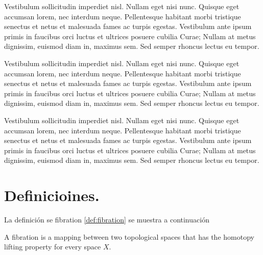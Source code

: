 	
	
	
	
	
	

	
	Vestibulum sollicitudin imperdiet nisl. Nullam eget nisi nunc. Quisque eget accumsan lorem, nec interdum neque. Pellentesque habitant morbi tristique senectus et netus et malesuada fames ac turpis egestas. Vestibulum ante ipsum primis in faucibus orci luctus et ultrices posuere cubilia Curae; Nullam at metus dignissim, euismod diam in, maximus sem. Sed semper rhoncus lectus eu tempor.
	
	Vestibulum sollicitudin imperdiet nisl. Nullam eget nisi nunc. Quisque eget accumsan lorem, nec interdum neque. Pellentesque habitant morbi tristique senectus et netus et malesuada fames ac turpis egestas. Vestibulum ante ipsum primis in faucibus orci luctus et ultrices posuere cubilia Curae; Nullam at metus dignissim, euismod diam in, maximus sem. Sed semper rhoncus lectus eu tempor.
	
	Vestibulum sollicitudin imperdiet nisl. Nullam eget nisi nunc. Quisque eget accumsan lorem, nec interdum neque. Pellentesque habitant morbi tristique senectus et netus et malesuada fames ac turpis egestas. Vestibulum ante ipsum primis in faucibus orci luctus et ultrices posuere cubilia Curae; Nullam at metus dignissim, euismod diam in, maximus sem. Sed semper rhoncus lectus eu tempor.
	
	
	
	
	
\section{Definicioines.}

La definición se fibration \ref{def:fibration} se muestra a continuación

\begin{definition}[Fibration]
	\label{def:fibration}
	A fibration is a mapping between two topological spaces that has the homotopy lifting property for every space \(X\).
\end{definition}
	
